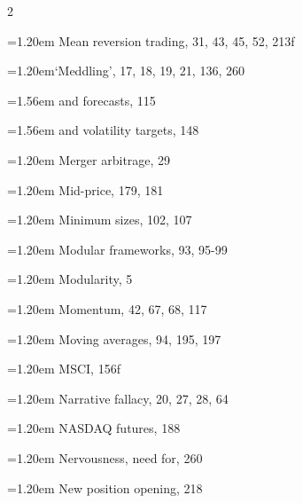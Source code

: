 {\begin{multicols}{2}
\par \noindent\hangindent=1.20em\hspace*{0.00em} Mean reversion trading, 31, 43, 45, 52, 213f
\par \noindent\hangindent=1.20em\hspace*{0.00em}‘Meddling’, 17, 18, 19, 21, 136, 260
\par \noindent\hangindent=1.56em\hspace*{0.36em} and forecasts, 115
\par \noindent\hangindent=1.56em\hspace*{0.36em} and volatility targets, 148
\par \noindent\hangindent=1.20em\hspace*{0.00em} Merger arbitrage, 29
\par \noindent\hangindent=1.20em\hspace*{0.00em} Mid-price, 179, 181
\par \noindent\hangindent=1.20em\hspace*{0.00em} Minimum sizes, 102, 107
\par \noindent\hangindent=1.20em\hspace*{0.00em} Modular frameworks, 93, 95-99
\par \noindent\hangindent=1.20em\hspace*{0.00em} Modularity, 5
\par \noindent\hangindent=1.20em\hspace*{0.00em} Momentum, 42, 67, 68, 117
\par \noindent\hangindent=1.20em\hspace*{0.00em} Moving averages, 94, 195, 197
\par \noindent\hangindent=1.20em\hspace*{0.00em} MSCI, 156f
\par \noindent\hangindent=1.20em\hspace*{0.00em} Narrative fallacy, 20, 27, 28, 64
\par \noindent\hangindent=1.20em\hspace*{0.00em} NASDAQ futures, 188
\par \noindent\hangindent=1.20em\hspace*{0.00em} Nervousness, need for, 260
\par \noindent\hangindent=1.20em\hspace*{0.00em} New position opening, 218

\end{multicols}}
